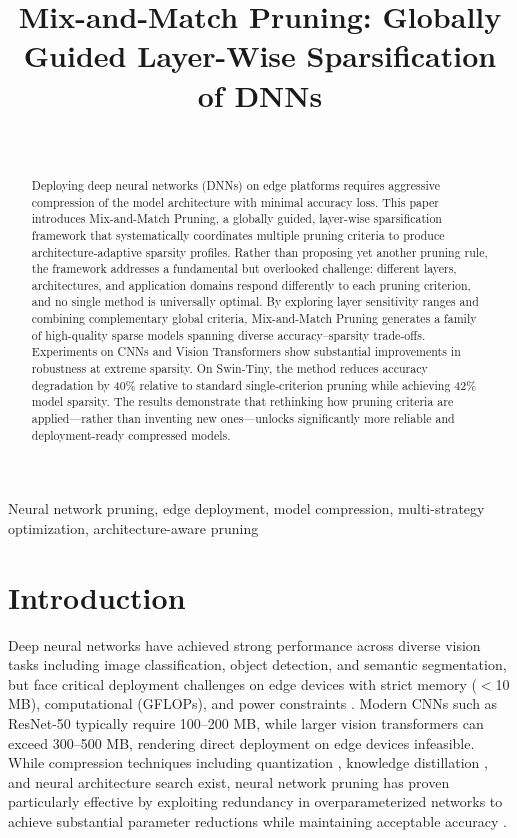\documentclass[11pt, conference]{IEEEtran}
\title{Mix-and-Match Pruning: Globally Guided Layer-Wise Sparsification of DNNs}
\author{
\IEEEauthorblockN{Danial Monachan$^{1}$,
Mahdi Taheri$^{1,2}$,
Samira Nazari$^{1}$,
Christian Herglotz$^{1}$}\\
\IEEEauthorblockA{$^{1}$Brandenburg University of Technology, Cottbus, Germany}
\IEEEauthorblockA{$^{2}$Tallinn University of Technology, Tallinn, Estonia}
}
\begin{document}
\maketitle

\begin{abstract}
Deploying deep neural networks (DNNs) on edge platforms requires aggressive compression of the model architecture with minimal accuracy loss. This paper introduces Mix-and-Match Pruning, a globally guided, layer-wise sparsification framework that systematically coordinates multiple pruning criteria to produce architecture-adaptive sparsity profiles. Rather than proposing yet another pruning rule, the framework addresses a fundamental but overlooked challenge: different layers, architectures, and application domains respond differently to each pruning criterion, and no single method is universally optimal. By exploring layer sensitivity ranges and combining complementary global criteria, Mix-and-Match Pruning generates a family of high-quality sparse models spanning diverse accuracy–sparsity trade-offs. Experiments on CNNs and Vision Transformers show substantial improvements in robustness at extreme sparsity. On Swin-Tiny, the method reduces accuracy degradation by 40\% relative to standard single-criterion pruning while achieving 42\% model sparsity. The results demonstrate that rethinking how pruning criteria are applied—rather than inventing new ones—unlocks significantly more reliable and deployment-ready compressed models.
\end{abstract}

\begin{IEEEkeywords}
Neural network pruning, edge deployment, model compression, multi-strategy optimization, architecture-aware pruning
\end{IEEEkeywords}

\FloatBarrier
\section{Introduction}

Deep neural networks have achieved strong performance across diverse vision tasks including image classification, object detection, and semantic segmentation, but face critical deployment challenges on edge devices with strict memory ($<$10 MB), computational (GFLOPs), and power constraints \cite{chavan2024edgeai, promwad2024compression}. Modern CNNs such as ResNet-50 typically require 100--200 MB, while larger vision transformers can exceed 300--500 MB, rendering direct deployment on edge devices infeasible. While compression techniques including quantization \cite{jacob2018quantization}, knowledge distillation \cite{hinton2015distilling}, and neural architecture search \cite{zoph2017neural} exist, neural network pruning has proven particularly effective by exploiting redundancy in overparameterized networks to achieve substantial parameter reductions while maintaining acceptable accuracy \cite{liu2024memory, zhang2024recap}.
\end{document}
